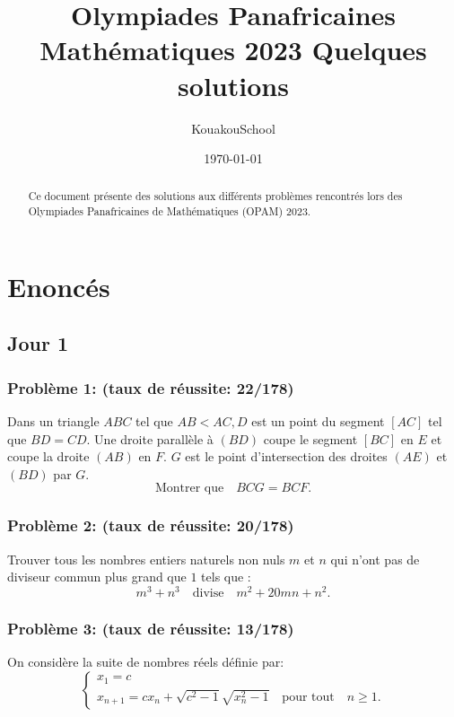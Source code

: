 \documentclass[12pt,a4paper,article]{memoir}
\title{Olympiades Panafricaines Mathématiques 2023 \newline Quelques solutions}
\author{KouakouSchool}
\date{\today} %
\begin{document}
\maketitle
\tableofcontents

\vspace{3 cm}

\begin{abstract}
Ce document présente des solutions aux différents problèmes rencontrés lors des Olympiades Panafricaines de Mathématiques (OPAM) 2023.
\end{abstract}

\chapter{Enoncés}
\section{Jour 1}
\subsection{Problème 1: (taux de réussite: 22/178)}
Dans un triangle  $ABC$ tel que $AB < AC, D$ est un point du segment $[AC]$ tel que $BD=CD$. Une droite parallèle à $(BD)$ coupe le segment
 $[BC]$ en  $E$ et coupe la droite  $(AB)$ en  $F$.  $G$ est le point d'intersection des droites  $(AE)$ et  $(BD)$ par  $G$. 
 \begin{equation}
 \textrm{Montrer que} \quad  BCG = BCF.
 \end{equation}
 
\subsection{Problème 2: (taux de réussite: 20/178)}
Trouver tous les nombres entiers naturels non nuls $m$ et $n$ qui n'ont pas de diviseur commun plus grand que $1$ tels que :
\begin{equation}
m^3 + n^3 \quad \textrm{divise} \quad m^2 + 20mn + n^2.
\end{equation}

\subsection{Problème 3: (taux de réussite: 13/178)}
On considère la suite de nombres réels définie par: 
\begin{equation}
\left\{
	\begin{array}{l}
	x_1 = c \\
	x_{n+1} = cx_{n} + \sqrt{c^2 - 1}\sqrt{x_{n}^2 - 1}  \quad \textrm{pour tout} \quad n \geq 1.
	\end{array}
\right.
\end{equation}
\end{document}
